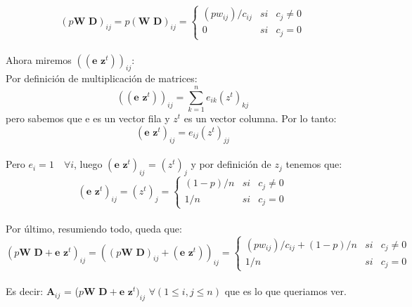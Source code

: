 \begin{equation*}
(\textit{p} \textbf{W D})_{ij}  = \textit{p} (\textbf{W D})_{ij} =  \left\{ \begin{array}{lcc}
  (p w_{ij})/ c_{ij} & si & c_{j} \neq 0
\\ 0 &si& c_{j} = 0
\end{array}
\right.
\end{equation*}
\\
Ahora miremos $((\textbf{e z}^t))_{ij}$:
\\
Por definición de multiplicación de matrices:
\begin{equation*}
 ((\textbf{e z}^t))_{ij} = \sum_{k=1}^{n} e_{ik} (z^t)_{kj}
\end{equation*}
pero sabemos que e es un vector fila y $z^t$ es un vector columna.
Por lo tanto:
\begin{equation*}
(\textbf{e z}^t)_{ij} = e_{ij} (z^t)_{jj}
\end{equation*}
 \\
Pero $e_{i} = 1 \quad \forall i$, luego $(\textbf{e z}^t)_{ij}$ = $(z^t)_{j}$ y por definición de $z_{j}$ tenemos que:
\begin{equation*}
(\textbf{e z}^t)_{ij} = (z^t)_{j} =  \left\{ \begin{array}{lcc}
   (1-p)/n & si & c_{j} \neq 0
\\ 1/n &si& c_{j} = 0
\end{array}
\right.
\end{equation*}
 \\
Por último, resumiendo todo, queda que:
\begin{equation*}
(\textit{p} \textbf{W D} + \textbf{e z}^t)_{ij} = ((\textit{p} \textbf{W D})_{ij} + (\textbf{e z}^t))_{ij}  = \left\{ \begin{array}{lcc}
 (p w_{ij})/ c_{ij} + (1-p)/n & si & c_{j} \neq 0
\\ 1 / n &si& c_{j} = 0
\end{array}
\right.
\end{equation*}
 \\
Es decir: $\textbf{A}_{ij}$ = ($\textit{p} \textbf{W D} + \textbf{e z}^t)_{ij}$    $\forall ( 1 \leq i, j \leq n) $ que es lo que queriamos ver.
 \\
 \\
